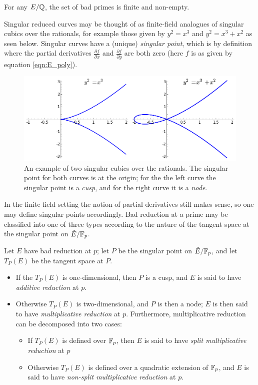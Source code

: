 \documentclass[10pt]{article}
\begin{document}
\begin{theorem}
For any $E/\mathbb{Q}$, the set of bad primes is finite and non-empty.
\end{theorem}

Singular reduced curves may be thought of as finite-field analogues of singular cubics over the rationals, for example those given by $y^2 = x^3$ and $y^2 = x^3+x^2$ as seen below. Singular curves have a (unique) {\it singular point}, which is by definition where the partial derivatives $\frac{\partial f}{\partial x}$ and $\frac{\partial f}{\partial y}$ are both zero (here $f$ is as given by equation \ref{eqn:E_poly}).

\begin{figure}[!h]
    \centering
    \includegraphics[width=1.0\textwidth]{graphics/singular_cubics.png}
    \caption{An example of two singular cubics over the rationals. The singular point for both curves is at the origin; for the the left curve the singular point is a {\it cusp}, and for the right curve it is a {\it node}.}
    \label{fig:singular_cubics}
\end{figure}

In the finite field setting the notion of partial derivatives still makes sense, so one may define singular points accordingly. Bad reduction at a prime may be classified into one of three types according to the nature of the tangent space at the singular point on $\tilde{E}/\mathbb{F}_p$.
\begin{definition}
Let $E$ have bad reduction at $p$; let $P$ be the singular point on $\tilde{E}/\mathbb{F}_p$, and let $T_P(E)$ be the tangent space at $P$.
\begin{itemize}
\item If the $T_P(E)$ is one-dimensional, then $P$ is a cusp, and $E$ is said to have {\it additive reduction} at $p$.
\item Otherwise $T_P(E)$ is two-dimensional, and $P$ is then a node; $E$ is then said to have {\it multiplicative reduction} at $p$. Furthermore, multiplicative reduction can be decomposed into two cases:
\begin{itemize}
\item If $T_P(E)$ is defined over $\mathbb{F}_p$, then $E$ is said to have {\it split multiplicative reduction} at $p$
\item Otherwise $T_P(E)$ is defined over a quadratic extension of $\mathbb{F}_p$, and $E$ is said to have {\it non-split multiplicative reduction} at $p$.
\end{itemize}
\end{itemize}
\end{definition}
\end{document}
